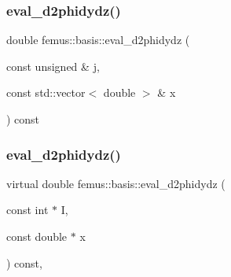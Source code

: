 \mbox{\label{classfemus_1_1basis_af7ee9e4c4a8e6204e7504bb25c326d62}} 
\subsubsection{\texorpdfstring{eval\+\_\+d2phidydz()}{eval\_d2phidydz()}\hspace{0.1cm}{\footnotesize\ttfamily [1/2]}}
{\footnotesize\ttfamily double femus\+::basis\+::eval\+\_\+d2phidydz (\begin{DoxyParamCaption}\item[{const unsigned \&}]{j,  }\item[{const std\+::vector$<$ double $>$ \&}]{x }\end{DoxyParamCaption}) const\hspace{0.3cm}{\ttfamily [inline]}}

\mbox{\label{classfemus_1_1basis_ab9e060e9c9e763d8c10fdffcc5e0b774}} 
\subsubsection{\texorpdfstring{eval\+\_\+d2phidydz()}{eval\_d2phidydz()}\hspace{0.1cm}{\footnotesize\ttfamily [2/2]}}
{\footnotesize\ttfamily virtual double femus\+::basis\+::eval\+\_\+d2phidydz (\begin{DoxyParamCaption}\item[{const int $\ast$}]{I,  }\item[{const double $\ast$}]{x }\end{DoxyParamCaption}) const\hspace{0.3cm}{\ttfamily [inline]}, {\ttfamily [virtual]}}



